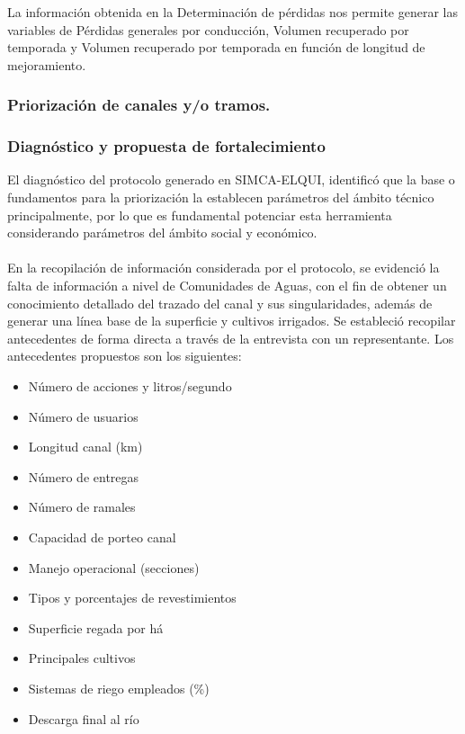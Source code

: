 \documentclass[]{article}
\begin{document}

La información obtenida en la Determinación de pérdidas nos permite generar las variables de Pérdidas generales por conducción, Volumen recuperado por temporada y Volumen recuperado por temporada en función de longitud de mejoramiento.

\subsubsection{Priorización de canales y/o tramos.}



\subsubsection{Diagnóstico y propuesta de fortalecimiento}

El diagnóstico del protocolo generado en SIMCA-ELQUI, identificó que la base o fundamentos para la priorización la establecen parámetros del ámbito técnico principalmente, por lo que es fundamental potenciar esta herramienta considerando parámetros del ámbito social y económico.\\
\\
En la recopilación de información considerada por el protocolo, se evidenció la falta de información a nivel de Comunidades de Aguas, con el fin de obtener un conocimiento detallado del trazado del canal y sus singularidades, además de generar una línea base de la superficie y cultivos irrigados. Se estableció recopilar antecedentes de forma directa a través de la entrevista con un representante. Los antecedentes propuestos son los siguientes:

\begin{itemize}
\item Número de acciones y litros/segundo
\item Número de usuarios
\item Longitud canal (km)
\item Número de entregas
\item Número de ramales
\item Capacidad de porteo canal
\item Manejo operacional (secciones)
\item Tipos y porcentajes de revestimientos
\item Superficie regada por há
\item Principales cultivos
\item Sistemas de riego empleados (\%)
\item Descarga final al río
\end{itemize}
\end{document}
